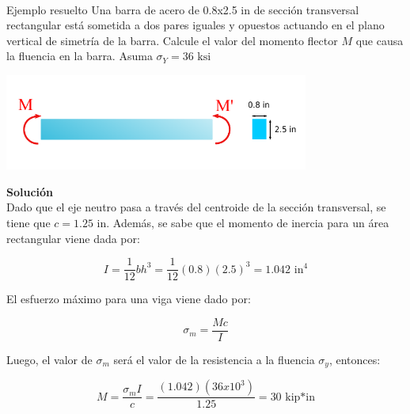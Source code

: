\documentclass[12pt,letterpaper]{article}
\begin{document}
\hfill \\[20mm]
\begin{ejemplo}{Ejemplo resuelto}
Una barra de acero de 0.8x2.5 in de sección transversal rectangular está sometida a dos pares iguales y opuestos actuando en el 
plano vertical de simetría de la barra. Calcule el valor del momento flector $M$ que causa la fluencia en la barra. 
Asuma $\sigma_Y = 36 \text{ ksi}$

\begin{center}
\includegraphics[width=0.75\textwidth]{img/ejemplo_01.pdf}
\end{center}

\textbf{Solución} \\

Dado que el eje neutro pasa a través del centroide de la sección transversal, se tiene que $c=1.25$ in. Además, 
se sabe que el momento de inercia para un área rectangular viene dada por:

$$ I = \frac{1}{12}bh^3 = \frac{1}{12}(0.8)(2.5)^3 = 1.042 \text{ in}^4 $$ 

El esfuerzo máximo para una viga viene dado por:

$$ \sigma_m = \frac{Mc}{I} $$

Luego, el valor de $\sigma_m$ será el valor de la resistencia a la fluencia $\sigma_y$, entonces:

$$ M = \frac{\sigma_m I}{c} = \frac{(1.042)(36x10^3)}{1.25} = 30 \text{ kip*in} $$

\end{ejemplo}
\end{document}
